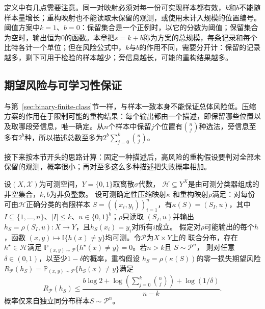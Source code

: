 定义中有几点需要注意。同一对映射必须对每一份可实现样本都有效，$k$和$b$不能随样本量增长；重构映射也不能读取未保留的观测，或使用未计入规模的位置编号。阈值方案中$k=1$、$b=0$：保留集合是一个正例时，以它的分数为阈值；保留集合为空时，输出恒为0的函数。本章把$s=k+b$称为方案的总规模，每条记录和每个比特各计一个单位；但在风险公式中，$k$与$b$的作用不同，需要分开计：保留的记录越多，剩下可用于检验的样本越少；旁信息越长，可能的重构结果越多。

\subsection{期望风险与可学习性保证}

与第~\ref{sec:binary-finite-class}节一样，与样本一致本身不能保证总体风险低。压缩方案的作用在于限制可能的重构结果：每个输出都由一个描述，即保留哪些位置以及取哪段旁信息，唯一确定。从$n$个样本中保留$j$个位置有$\binom nj$种选法，旁信息至多有$2^b$种，所以描述总数至多为$2^b\sum_{j=0}^k\binom nj$。

接下来按本节开头的思路计算：固定一种描述后，高风险的重构假设要判对全部未保留的观测，概率很小；再对至多这么多种描述把失败概率相加。

\begin{theorem}[一致样本压缩的期望风险上界]
\label{thm:sample-compression-bound}
设$(X,\mathcal X)$为可测空间，$Y=\{0,1\}$取离散$\sigma$代数，
$\mathcal H\subseteq Y^X$是由可测分类器组成的非空集合，$k,b$为非负整数。
设可测确定性压缩映射$\kappa$
和重构映射$\rho$满足：对每份可由$\mathcal H$正确分类的有限样本
$S=((x_i,y_i))_{i=1}^n$，有$\kappa(S)=(S_I,u)$，其中
$I\subseteq\{1,\ldots,n\}$、$|I|\leq k$、$u\in\{0,1\}^b$；$\rho$只读取
$(S_I,u)$并输出$h_S=\rho(S_I,u):X\to Y$，且$h_S(x_i)=y_i$对所有$i$成立。
假定对$\rho$可能输出的每个$h$，函数
$(x,y)\mapsto\mathbb I\{h(x)\neq y\}$均可测。令$\mathcal P$为$X\times Y$上的
联合分布，存在$h^\star\in\mathcal H$满足
$\mathbb P_{(x,y)\sim\mathcal P}\{h^\star(x)\neq y\}=0$。若$n>k$且
$S\sim\mathcal P^n$，
则对任意$\delta\in(0,1)$，以至少$1-\delta$的概率，重构假设
$h_S=\rho(\kappa(S))$的零一损失期望风险
$R_{\mathcal P}(h_S)=\mathbb P_{(x,y)\sim\mathcal P}\{h_S(x)\neq y\}$满足
\begin{equation}
 R_{\mathcal P}(h_S)
 \leq\frac{b\log2+\log\!\left(\sum_{j=0}^k\binom nj\right)+\log(1/\delta)}{n-k}.
 \label{eq:compression-generalization}
\end{equation}
概率仅来自独立同分布样本$S\sim\mathcal P^n$。
\end{theorem}

